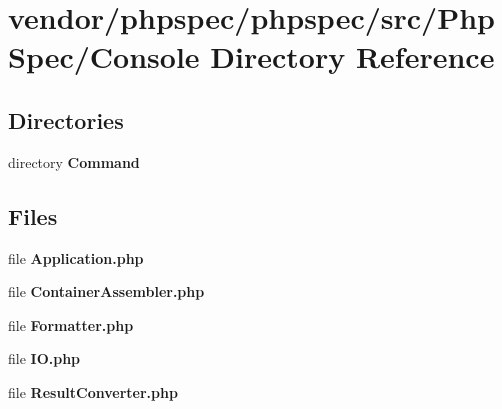 \section{vendor/phpspec/phpspec/src/\+Php\+Spec/\+Console Directory Reference}
\label{dir_235053afa7fb7ec64a63898739a7c25a}
\subsection*{Directories}
\begin{DoxyCompactItemize}
\item 
directory {\bf Command}
\end{DoxyCompactItemize}
\subsection*{Files}
\begin{DoxyCompactItemize}
\item 
file {\bf Application.\+php}
\item 
file {\bf Container\+Assembler.\+php}
\item 
file {\bf Formatter.\+php}
\item 
file {\bf I\+O.\+php}
\item 
file {\bf Result\+Converter.\+php}
\end{DoxyCompactItemize}
